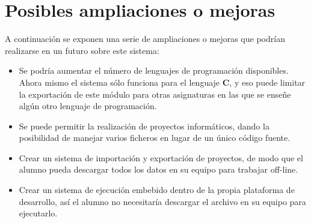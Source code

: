 \section{Posibles ampliaciones o mejoras}

A continuación se exponen una serie de ampliaciones o mejoras que podrían realizarse en un futuro sobre este sistema:

\begin{itemize}
	\item Se podría aumentar el número de lenguajes de programación disponibles. Ahora mismo el sistema sólo funciona para el lenguaje \textbf{C}, y eso puede limitar la exportación de este módulo para otras asignaturas en las que se enseñe algún otro lenguaje de programación. 
	\item Se puede permitir la realización de proyectos informáticos, dando la posibilidad de manejar varios ficheros en lugar de un único código fuente.
	\item Crear un sistema de importación y exportación de proyectos, de modo que el alumno pueda descargar todos los datos en su equipo para trabajar off-line.
	\item Crear un sistema de ejecución embebido dentro de la propia plataforma de desarrollo, así el alumno no necesitaría descargar el archivo en su equipo para ejecutarlo.
\end{itemize}